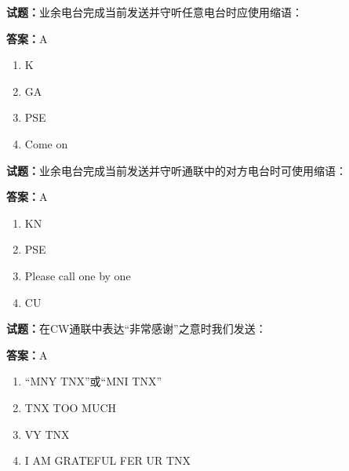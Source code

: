 \documentclass{ctexbook}
\begin{document}




\vspace{1em}

\textbf{试题：}业余电台完成当前发送并守听任意电台时应使用缩语： 

\textbf{答案：}A 

\begin{enumerate}[leftmargin=3em]
  \item K 

  \item GA 

  \item PSE 

  \item Come on 

\end{enumerate}





\vspace{1em}

\textbf{试题：}业余电台完成当前发送并守听通联中的对方电台时可使用缩语： 

\textbf{答案：}A 

\begin{enumerate}[leftmargin=3em]
  \item KN 

  \item PSE 

  \item Please call one by one 

  \item CU 

\end{enumerate}






\vspace{1em}

\textbf{试题：}在CW通联中表达“非常感谢”之意时我们发送： 

\textbf{答案：}A 

\begin{enumerate}[leftmargin=3em]
  \item “MNY TNX”或“MNI TNX” 

  \item TNX TOO MUCH 

  \item VY TNX 

  \item I AM GRATEFUL FER UR TNX 

\end{enumerate}
\end{document}
